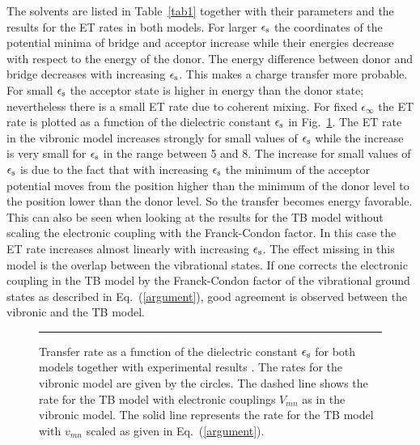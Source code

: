 \documentclass[12pt,twoside,a4paper]{report}
\begin{document}
The solvents are listed
in Table~\ref{tab1} 
together with their parameters and the results for the ET
rates in both models. 
For larger $\epsilon_{\rm s}$ the coordinates of the potential
minima of bridge and acceptor increase while their energies decrease
with respect to the energy of the donor.  The energy
difference between donor and bridge decreases with increasing
$\epsilon_{\rm s}$.  This makes a charge transfer more probable.
For small $\epsilon_{\rm s}$ 
the acceptor state is higher in energy than the donor state;
nevertheless there is a small ET rate due to coherent mixing.
For fixed $\epsilon_{\infty}$ the ET rate is plotted as a function of
the dielectric constant $\epsilon_{\rm s}$ in Fig.~\ref{ET-via-epsilon}. 
%
%
%
%
The ET rate in
the vibronic model increases strongly for small values of
$\epsilon_{\rm s}$ while the increase is very small for 
$\epsilon_{\rm s}$ in the range between 5 and 8. The increase for small values of
$\epsilon_{\rm s}$ is due to the fact that with increasing
$\epsilon_{\rm s}$ the minimum of the acceptor potential moves from 
the position higher than the minimum of the donor level to 
the  position lower than the donor level. So the transfer becomes energy
favorable.  This can also be seen when looking at the results for the
TB model without scaling the electronic coupling with the
Franck-Condon factor. In this case the ET rate increases almost
linearly with increasing $\epsilon_{\rm s}$. The effect missing in
this model is the overlap between the vibrational states. If one
corrects the electronic coupling in the TB model by the
Franck-Condon factor of the vibrational ground states as described in
Eq.~(\ref{argument}), good agreement is observed between the vibronic and
the TB model.
\begin{footnotesize}\begin{figure}[!h]
  \begin{center}
\parbox{4.0cm}{\rule{-3cm}{.1cm}\epsfxsize=10.0cm}
    \leavevmode
    \caption[Transfer rate as a function of the dielectric constant for two models]
{\small
        \label{ET-via-epsilon}
   Transfer rate as a function of the dielectric constant 
   $\epsilon_{\rm s}$ for both models together with experimental 
results \protect \cite{r4}. The rates for the vibronic model
are given by the circles.
The dashed line shows the rate for the TB model  with
electronic couplings $V_{mn}$ as in the vibronic model. The
solid line represents the rate for the TB model
with $v_{mn}$ scaled as given in Eq.\ \protect (\ref{argument}).}
  \end{center}
\end{figure}\end{footnotesize}
\end{document}
